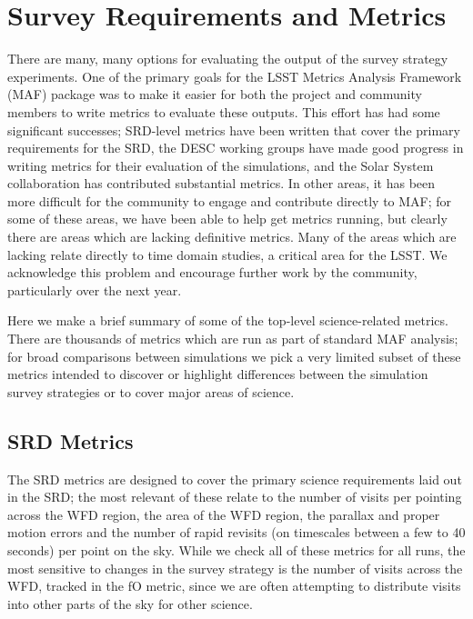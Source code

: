\section{Survey Requirements and Metrics}

There are many, many options for evaluating the output of the survey strategy experiments. One of the primary goals for the LSST Metrics Analysis Framework (MAF) package was to make it easier for both the project and community members to write metrics to evaluate these outputs. This effort has had some significant successes; SRD-level metrics have been written that cover the primary requirements for the SRD, the DESC working groups have made good progress in writing metrics for their evaluation of the simulations, and the Solar System collaboration has contributed substantial metrics. In other areas, it has been more difficult for the community to engage and contribute directly to MAF; for some of these areas, we have been able to help get metrics running, but clearly there are areas which are lacking definitive metrics. Many of the areas which are lacking relate directly to time domain studies, a critical area for the LSST. We acknowledge this problem and encourage further work by the community, particularly over the next year. 

Here we make a brief summary of some of the top-level science-related metrics. There are thousands of metrics which are run as part of standard MAF analysis; for broad comparisons between simulations we pick a very limited subset of these metrics intended to discover or highlight differences between the simulation survey strategies or to cover major areas of science. 

\subsection{SRD Metrics}

The SRD metrics are designed to cover the primary science requirements laid out in the SRD; the most relevant of these relate to the number of visits per pointing across the WFD region, the area of the WFD region, the parallax and proper motion errors and the number of rapid revisits (on timescales between a few to 40 seconds) per point on the sky. While we check all of these metrics for all runs, the most sensitive to changes in the survey strategy is the number of visits across the WFD, tracked in the fO metric, since we are often attempting to distribute visits into other parts of the sky for other science. 

